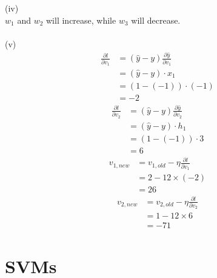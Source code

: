 \documentclass[11pt]{article}
\begin{document}
\begin{enumerate}
\begin{answertext}{22cm}{}
\end{answertext} 

\begin{answertext}{22cm}{}

(iv) \\ 
$w_{1}$ and $w_{2}$ will increase, while $w_{3}$ will decrease. \\
\\
(v) \\
\begin{align*}
\frac{\partial{l}}{\partial{v_{1}}} &= (\hat{y} - y) \frac{\partial{\hat{y}}}{\partial{v_{1}}} \\
&= (\hat{y} - y) \cdot x_{1} \\
&= (1 - (-1)) \cdot (-1) \\
&= -2
\end{align*}
\begin{align*}
\frac{\partial{l}}{\partial{v_{2}}} &= (\hat{y} - y) \frac{\partial{\hat{y}}}{\partial{v_{2}}} \\
&= (\hat{y} - y) \cdot h_{1} \\
&= (1 - (-1)) \cdot 3 \\
&= 6
\end{align*}
\begin{align*}
v_{1,new} &= v_{1,old} - \eta \frac{\partial{l}}{\partial{v_{1}}} \\
&= 2 - 12 \times (-2) \\
&= 26
\end{align*}
\begin{align*}
v_{2,new} &= v_{2,old} - \eta \frac{\partial{l}}{\partial{v_{2}}} \\
&= 1 - 12 \times 6 \\
&= -71
\end{align*}

\end{answertext}

\end{enumerate}

\pagebreak
\section{SVMs}
\end{document}
